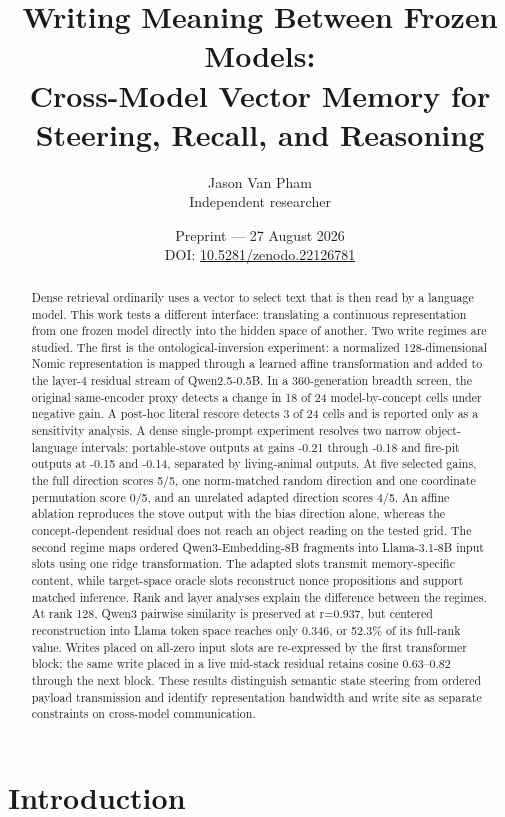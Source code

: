 \documentclass[11pt]{article}
\title{\textbf{Writing Meaning Between Frozen Models:}\\[0.35em]
{\large Cross-Model Vector Memory for Steering, Recall, and Reasoning}}
\author{Jason Van Pham\\[0.4em]
{\normalsize Independent researcher}}
\date{Preprint --- 27 August 2026\\[0.6em]
{\normalsize DOI: \href{https://doi.org/10.5281/zenodo.22126781}{10.5281/zenodo.22126781}}}
\begin{document}
\maketitle
\begin{abstract}
Dense retrieval ordinarily uses a vector to select text that is then read by a language model. This work tests a different interface: translating a continuous representation from one frozen model directly into the hidden space of another. Two write regimes are studied. The first is the ontological-inversion experiment: a normalized 128-dimensional Nomic representation is mapped through a learned affine transformation and added to the layer-4 residual stream of Qwen2.5-0.5B. In a 360-generation breadth screen, the original same-encoder proxy detects a change in 18 of 24 model-by-concept cells under negative gain. A post-hoc literal rescore detects 3 of 24 cells and is reported only as a sensitivity analysis. A dense single-prompt experiment resolves two narrow object-language intervals: portable-stove outputs at gains -0.21 through -0.18 and fire-pit outputs at -0.15 and -0.14, separated by living-animal outputs. At five selected gains, the full direction scores 5/5, one norm-matched random direction and one coordinate permutation score 0/5, and an unrelated adapted direction scores 4/5. An affine ablation reproduces the stove output with the bias direction alone, whereas the concept-dependent residual does not reach an object reading on the tested grid. The second regime maps ordered Qwen3-Embedding-8B fragments into Llama-3.1-8B input slots using one ridge transformation. The adapted slots transmit memory-specific content, while target-space oracle slots reconstruct nonce propositions and support matched inference. Rank and layer analyses explain the difference between the regimes. At rank 128, Qwen3 pairwise similarity is preserved at r=0.937, but centered reconstruction into Llama token space reaches only 0.346, or 52.3\% of its full-rank value. Writes placed on all-zero input slots are re-expressed by the first transformer block; the same write placed in a live mid-stack residual retains cosine 0.63--0.82 through the next block. These results distinguish semantic state steering from ordered payload transmission and identify representation bandwidth and write site as separate constraints on cross-model communication.
\end{abstract}

\section{Introduction}
\end{document}
